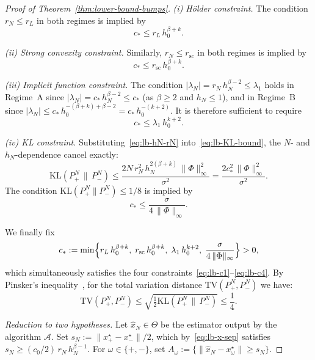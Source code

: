 \documentclass{article}
\renewcommand{\leq}{\leqslant}
\renewcommand{\geq}{\geqslant}
\renewcommand{\hat}{\widehat}
\theoremstyle{definition}
\begin{document}
\begin{proof}[Proof of Theorem~\ref{thm:lower-bound-bumps}]
\emph{(i) H\"older constraint.} The condition $r_N\leq r_L$ in 
both regimes is implied by
\begin{equation}
\label{eq:lb-c1}
c_*\leq r_L\,h_0^{\beta+k}.
\end{equation}

\emph{(ii) Strong convexity constraint.} Similarly, 
$r_N\leq r_{\mathrm{sc}}$ in both regimes is implied by
\begin{equation}
\label{eq:lb-c2}
c_*\leq r_{\mathrm{sc}}\,h_0^{\beta+k}.
\end{equation}

\emph{(iii) Implicit function constraint.} The condition 
$|\lambda_N|=r_N\,h_N^{\beta-2}\leq\lambda_1$ holds in Regime~A 
since $|\lambda_N|=c_*\,h_N^{\beta-2}\leq c_*$ (as $\beta\geq 2$ 
and $h_N\leq 1$), and in Regime~B since 
$|\lambda_N|\leq c_*\,h_0^{-(\beta+k)+\beta-2}
=c_*\,h_0^{-(k+2)}$. It is therefore sufficient to require
\begin{equation}
\label{eq:lb-c3}
c_*\leq\lambda_1\,h_0^{k+2}.
\end{equation}

\emph{(iv) KL constraint.} Substituting~\eqref{eq:lb-hN-rN} 
into~\eqref{eq:lb-KL-bound}, the $N$- and $h_N$-dependence 
cancel exactly:
\[
\mathrm{KL}(P_+^N\,\|\,P_-^N)
\leq\frac{2N\,r_N^2\,h_N^{2(\beta+k)}\,\|\Phi\|_\infty^2}{\sigma^2}
=\frac{2c_*^2\,\|\Phi\|_\infty^2}{\sigma^2}.
\]
The condition $\mathrm{KL}(P_+^N\|P_-^N)\leq 1/8$ is implied by
\begin{equation}
\label{eq:lb-c4}
c_*\leq\frac{\sigma}{4\,\|\Phi\|_\infty}.
\end{equation}

We finally fix
\begin{equation}
\label{eq:lb-cstar}
c_*:=\min\Bigl\{r_L\,h_0^{\beta+k},\;
r_{\mathrm{sc}}\,h_0^{\beta+k},\;
\lambda_1\,h_0^{k+2},\;\frac{\sigma}{4\,\|\Phi\|_\infty}\Bigr\}>0,
\end{equation}
which simultaneously satisfies the four 
constraints~\eqref{eq:lb-c1}--\eqref{eq:lb-c4}. By Pinsker's 
inequality~\cite[Lemma~2.5]{tsybakov2009nonparametric}, for the total variation distance $\mathrm{TV}(P_+^N,P_-^N)$ we have:
\begin{equation}
\label{eq:lb-TV}
\mathrm{TV}(P_+^N,P_-^N)\leq\sqrt{\tfrac{1}{2}
\mathrm{KL}(P_+^N\,\|\,P_-^N)}\leq\frac{1}{4}.
\end{equation}

\medskip
\noindent \textit{Reduction to two hypotheses.}
Let $\hat{x}_N\in\Theta$ be the estimator output by the 
algorithm $\mathcal{A}$. Set 
$s_N:=\|x_+^\star-x_-^\star\|/2$, which 
by~\eqref{eq:lb-x-sep} satisfies 
$s_N\geq(c_0/2)\,r_N\,h_N^{\beta-1}$. For 
$\omega\in\{+,-\}$, set 
$A_\omega:=\{\|\hat{x}_N-x_\omega^\star\|\geq s_N\}$.


\end{proof}
\end{document}
